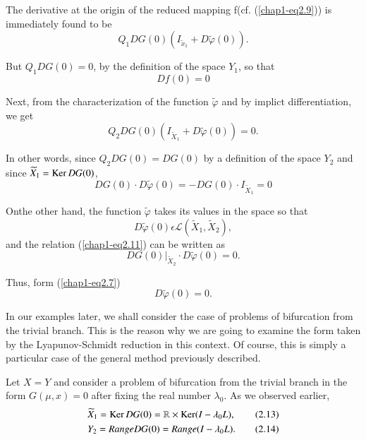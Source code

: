 \medskip
{}

The derivative at the origin of the reduced mapping f(cf. (\ref{chap1-eq2.9})) is immediately found to be
$$
Q_{1} DG(0) (I_{\widetilde{x}_{1}} + D\widetilde{\varphi}(0)).
$$

But $Q_{1} DG(0) = 0$, by the definition of the space $Y_{1}$, so that
\begin{equation*}
Df(0) = 0\tag{2.10}\label{chap1-eq2.10}
\end{equation*}

Next, from the characterization of the function $\widetilde{\varphi}$ and by implict differentiation, we get
$$
Q_{2} DG(0) (I_{\widetilde{X}_{1}} + D\widetilde{\varphi}(0)) = 0.
$$

In other words, since $Q_{2} DG(0) = DG(0)$ by a definition of the space $Y_{2}$ and since $\widetilde{X}_{1} = \operatorname{Ker} DG(0)$,
\begin{equation*}
DG(0) \cdot D\widetilde{\varphi}(0) = -DG(0) \cdot I_{\widetilde{X}_{1}} = 0\tag{2.11}\label{chap1-eq2.11}
\end{equation*}

On\pageoriginale the other hand, the function $\widetilde{\varphi}$ takes its values in the space so that
$$
D\widetilde{\varphi}(0) \epsilon \mathscr{L} (\widetilde{X}_{1}, \widetilde{X}_{2}),
$$
and the relation (\ref{chap1-eq2.11}) can be written as
$$
DG(0) |_{\widetilde{X}_{2}} \cdot D\widetilde{\varphi}(0) = 0.
$$

Thus, form (\ref{chap1-eq2.7})
\begin{equation*}
D\widetilde{\varphi}(0) = 0.\tag{2.12}\label{chap1-eq2.12}
\end{equation*}

\medskip
{}

In our examples later, we shall consider the case of problems of bifurcation from the trivial branch. This is the reason why we are going to examine the form taken by the Lyapunov-Schmidt reduction in this context. Of course, this is simply a particular case of the general method previously described.

Let $X = Y$ and consider a problem of bifurcation from the trivial branch in the form $G(\mu, x) = 0$ after fixing the real number $\lambda_{0}$. As we observed earlier,
\begin{align*}
& \widetilde{X}_{1} = \operatorname{Ker} DG(0) = \mathbb{R} \times \operatorname{Ker}(I - \lambda_{0}L),\tag{2.13}\label{chap1-eq2.13}\\
& Y_{2} = Range DG(0) = Range (I - \lambda_{0}L).\tag{2.14}\label{chap1-eq2.14}
\end{align*}

